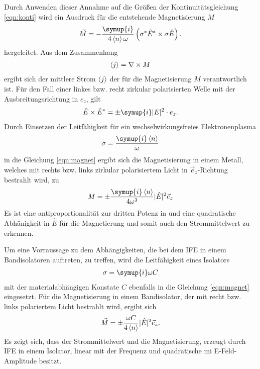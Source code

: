 Durch Anwenden dieser Annahme auf die Größen der Kontinuitätsgleichung \eqref{eqn:konti}
wird ein Ausdruck für die entstehende Magnetisierung $M$
\begin{align}
  \vec{M}=-\frac{\symup{i}}{4 \braket{n}\omega }\left(\sigma^*\hat{E}^* \times \sigma\hat{E}\right).\label{eqn:magnet}
\end{align}
hergeleitet.
Aus dem Zusammenhang
\begin{align}
\braket{j}=\nabla\times M
\end{align}
ergibt sich der mittlere Strom $\braket{j}$
der für die Magnetisierung $M$ verantwortlich ist.
Für den Fall einer linkes bzw. recht zirkular polarisierten Welle
mit der Ausbreitungsrichtung in $e_z$, gilt
\begin{align}
  \hat E \times \hat{E}^*=\pm\symup{i}\lvert E\rvert^2\cdot e_z.
\end{align}
Durch Einsetzen der Leitfähigkeit
für ein wechselwirkungsfreies Elektronenplasma
\begin{align}
\sigma=\frac{\symup{i}\braket{n}}{\omega}
\end{align}
in die Gleichung \eqref{eqn:magnet}
ergibt sich die Magnetisierung in einem Metall,
welches mit rechts bzw. links zirkular polarisiertem
Licht in $\vec{e}_z$-Richtung
bestrahlt wird, zu
\begin{align}
  M=\pm\frac{\symup{i}\braket{n}}{4\omega^3}\lvert\hat{E}\rvert^2 \vec{e}_z
\end{align}
Es ist eine antiproportionalität
zur dritten Potenz in \omega
und eine quadratische Abhänigkeit in $\hat{E}$
für die Magnetierung und somit auch den Strommittelwert
zu erkennen.

Um eine Vorraussage zu dem Abhängigkeiten, die
bei dem IFE in einem Bandisolatoren auftreten,
zu treffen, wird die Leitfähigkeit
eines Isolators
\begin{align}
  \sigma=\symup{i}\omega C
\end{align}
mit der materialabhängigen Konstate $C$
ebenfalls in die Gleichung \eqref{eqn:magnet}
eingesetzt.
Für die Magnetisierung in einem Bandisolator, der mit
recht bzw. links polariertem Licht bestrahlt wird,
ergibt sich
\begin{align}
  \vec{M}=\pm\frac{\omega C}{4\braket{n}} \lvert \hat{E}  \rvert^2 \vec{e}_z.
\end{align}
Es zeigt sich,
dass der Strommittelwert und die
Magnetisierung, erzeugt durch IFE in einem Isolator, linear
mit der Frequenz \omega und
quadratische mi E-Feld-Amplitude besitzt.




